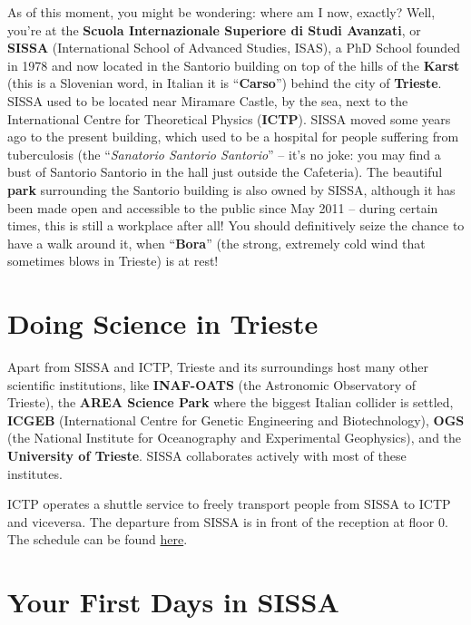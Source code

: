 \documentclass{sissavademecum}
\begin{document}
As of this moment, you might be wondering: where am I now, exactly? Well, you're at the \textbf{Scuola Internazionale Superiore di Studi Avanzati}, or \textbf{SISSA} (International School of Advanced Studies, ISAS), a PhD School founded in 1978 and now located in the Santorio building on top of the hills of the \textbf{Karst} (this is a Slovenian word, in Italian it is ``\textbf{Carso}'') behind the city of \textbf{Trieste}.\\
SISSA used to be located near Miramare Castle, by the sea, next to the International Centre for Theoretical Physics (\textbf{ICTP}). SISSA moved some years ago to the present building, which used to be a hospital for people suffering from tuberculosis (the ``\textit{Sanatorio Santorio Santorio}'' -- it's no joke: you may find a bust of Santorio Santorio in the hall just outside the Cafeteria). The beautiful \textbf{park }surrounding the Santorio building is also owned by SISSA, although it has been made open and accessible to the public since May 2011 -- during certain times, this is still a workplace after all! You should definitively seize the chance to have a walk around it, when ``\textbf{Bora}'' (the strong, extremely cold wind that sometimes blows in Trieste) is at rest!


\section{Doing Science in Trieste}

Apart from SISSA and ICTP, Trieste and its surroundings host many other scientific institutions, like \textbf{INAF-OATS }(the Astronomic Observatory of Trieste), the \textbf{AREA Science Park} where the biggest Italian collider is settled, \textbf{ICGEB }(International Centre for Genetic Engineering and Biotechnology), \textbf{OGS }(the National Institute for Oceanography and Experimental Geophysics), and the \textbf{University of Trieste}. SISSA collaborates actively with most of these institutes.

ICTP operates a shuttle service to freely transport people from SISSA to ICTP and viceversa. The departure from SISSA is in front of the reception at floor $0$. The schedule can be found \href{https://www.ictp.it/visit-ictp/transportation/campus-shuttle-services.aspx#close}{here}.


\section{Your First Days in SISSA}
\end{document}
